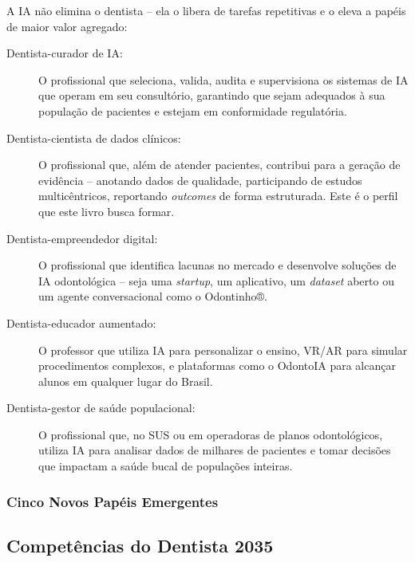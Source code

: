 A IA não elimina o dentista -- ela o libera de tarefas repetitivas e o eleva a
papéis de maior valor agregado:

\begin{description}
  \item[Dentista-curador de IA:] O profissional que seleciona, valida,
    audita e supervisiona os sistemas de IA que operam em seu consultório,
    garantindo que sejam adequados à sua população de pacientes e estejam em
    conformidade regulatória.

  \item[Dentista-cientista de dados clínicos:] O profissional que, além de
    atender pacientes, contribui para a geração de evidência -- anotando
    dados de qualidade, participando de estudos multicêntricos, reportando
    \textit{outcomes} de forma estruturada. Este é o perfil que este livro
    busca formar.

  \item[Dentista-empreendedor digital:] O profissional que identifica lacunas
    no mercado e desenvolve soluções de IA odontológica -- seja uma \textit{
    startup}, um aplicativo, um \textit{dataset} aberto ou um agente
    conversacional como o Odontinho®.

  \item[Dentista-educador aumentado:] O professor que utiliza IA para
    personalizar o ensino, VR/AR para simular procedimentos complexos, e
    plataformas como o OdontoIA para alcançar alunos em qualquer lugar do
    Brasil.

  \item[Dentista-gestor de saúde populacional:] O profissional que, no SUS ou
    em operadoras de planos odontológicos, utiliza IA para analisar dados de
    milhares de pacientes e tomar decisões que impactam a saúde bucal de
    populações inteiras.
\end{description}

\subsubsection{Cinco Novos Papéis Emergentes}

\subsection{Competências do Dentista 2035}

